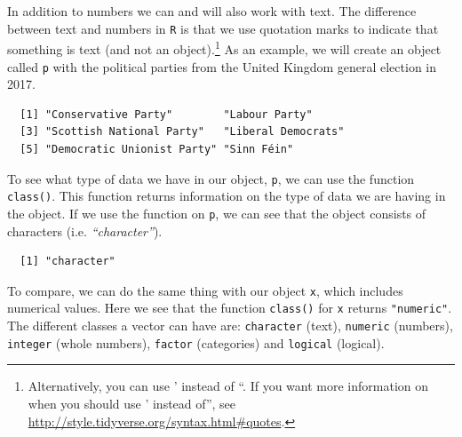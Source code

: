 \documentclass[12pt,oneside]{reedthesis}
\theoremstyle{definition}
\theoremstyle{definition}
\theoremstyle{definition}
\theoremstyle{remark}
\begin{document}
  In addition to numbers we can and will also work with text. The
  difference between text and numbers in \texttt{R} is that we use
  quotation marks to indicate that something is text (and not an
  object).\footnote{Alternatively, you can use ' instead of ``. If you
    want more information on when you should use ' instead of'', see
    \url{http://style.tidyverse.org/syntax.html\#quotes}.} As an example,
  we will create an object called \texttt{p} with the political parties
  from the United Kingdom general election in 2017.
  \begin{Shaded}
  \begin{Highlighting}[]
  \StringTok{ }\NormalTok{(}\NormalTok{, }\NormalTok{, }\NormalTok{, }
         \NormalTok{, }\NormalTok{, }\NormalTok{) }
  
  \end{Highlighting}
  \end{Shaded}
  \begin{verbatim}
  [1] "Conservative Party"        "Labour Party"             
  [3] "Scottish National Party"   "Liberal Democrats"        
  [5] "Democratic Unionist Party" "Sinn Féin"                
  \end{verbatim}
  To see what type of data we have in our object, \texttt{p}, we can use
  the function \texttt{class()}. This function returns information on the
  type of data we are having in the object. If we use the function on
  \texttt{p}, we can see that the object consists of characters (i.e.
  \emph{``character''}).
  \begin{Shaded}
  \begin{Highlighting}[]
  \end{Highlighting}
  \end{Shaded}
  \begin{verbatim}
  [1] "character"
  \end{verbatim}
  To compare, we can do the same thing with our object \texttt{x}, which
  includes numerical values. Here we see that the function
  \texttt{class()} for \texttt{x} returns \texttt{"numeric"}. The
  different classes a vector can have are: \texttt{character} (text),
  \texttt{numeric} (numbers), \texttt{integer} (whole numbers),
  \texttt{factor} (categories) and \texttt{logical} (logical).
  \begin{Shaded}
  \begin{Highlighting}[]
  \end{Highlighting}
  \end{Shaded}
\end{document}
